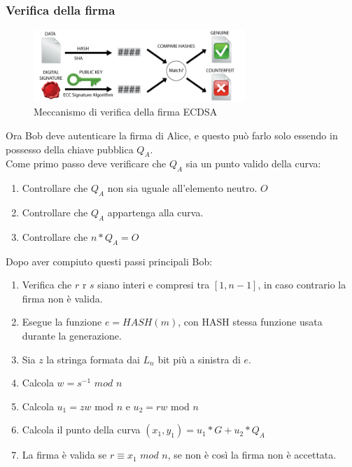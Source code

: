\documentclass[a4paper,11pt]{report}
\begin{document}
\subsubsection{Verifica della firma}
\begin{figure}[htbp] 
\begin{center}
\includegraphics[width=8cm]{img/E.png} 
\end{center}
\caption{Meccanismo di verifica della firma ECDSA}
\end{figure}
Ora Bob deve autenticare la firma di Alice, e questo può farlo solo essendo in possesso della chiave pubblica $Q_{A}$.\\
Come primo passo deve verificare che $Q_{A}$ sia un punto valido della curva:
\begin{enumerate}
\item Controllare che $Q_{A}$ non sia uguale all'elemento neutro. $O$
\item Controllare che $Q_{A}$ appartenga alla curva.
\item Controllare che $n*Q_{A}=O$ 
\end{enumerate}
Dopo aver compiuto questi passi principali Bob:
\begin{enumerate}
\item Verifica che $r$ r $s$ siano interi e compresi tra $[1,n-1]$, in caso contrario la firma non è valida.
\item Esegue la funzione $e=HASH(m)$, con HASH stessa funzione usata durante la generazione.
\item Sia $z$ la stringa formata dai $L_{n}$ bit più a sinistra di $e$.
\item Calcola $w=s^{-1}$ $mod$ $n$
\item Calcola $u_{1} = zw$ mod $n$ e $u_{2} = rw$ mod $n$
\item Calcola il punto della curva $(x_{1},y_{1}) = u_{1}*G+u_{2}*Q_{A}$
\item La firma è valida se $r\equiv x_{1}$ $mod$ $n$, se non è così la firma non è accettata.
\end{enumerate}
\end{document}
